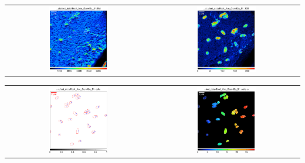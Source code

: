 \documentclass[12pt,a4paper]{article}
\begin{document}
\begin{center}
\begin{tabular}{cc}
\end{tabular}
\begin{tabular}{cc}
\includegraphics[width=0.42\textwidth]{pdf/Esi} & \includegraphics[width=0.42\textwidth]{pdf/32S} \\
\end{tabular}
\begin{tabular}{cc}
\includegraphics[width=0.42\textwidth]{pdf/cells} & \includegraphics[width=0.42\textwidth]{pdf/cells-c} \\

\end{tabular}
\end{center}
\end{document}
